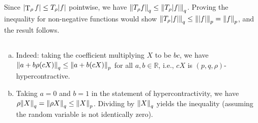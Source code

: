 \documentclass[12pt]{article}
\newcommand{\R}{\mathbb R}
\DeclareMathOperator{\T}{T}
\begin{document}
\subsection{}
Since $\abs{\T_\rho f} \leq T_\rho \abs{f}$ pointwise, we have $\norm{T_\rho f}_q \leq \norm{T_\rho \abs{f}}_q$. Proving the inequality for non-negative functions would show $\norm{T_\rho \abs{f}}_q \leq \norm{\abs{f}}_p = \norm{f}_p$, and the result follows.

\subsection{}

\subsection{}
\begin{enumerate}[(a)]
    \item Indeed: taking the coefficient multiplying $X$ to be $bc$, we have $\norm{a + b \rho (c X)}_q \leq \norm{a + b (c X)}_p$ for all $a, b \in \R$, i.e., $cX$ is $(p, q, \rho)$-hypercontractive.
    
    \item Taking $a = 0$ and $b = 1$ in the statement of hypercontractivity, we have $\rho \norm{X}_q = \norm{\rho X}_q \leq \norm{X}_p$. Dividing by $\norm{X}_q$ yields the inequality (assuming the random variable is not identically zero).
\end{enumerate}
\end{document}
